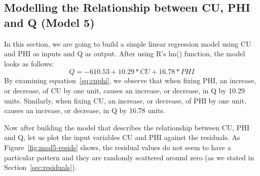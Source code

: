 \documentclass[a4paper,12pt, english]{article}
\begin{document}
\subsection{Modelling the Relationship between CU, PHI and Q (Model 5)} \label{sec:cuphimodel}
In this section, we are going to build a simple linear regression model using CU and PHI as inputs and Q as output. After using R's lm() function, the model looks as follows:\\
\begin{equation}
\label{eq:cuphi}
Q = -610.53  +     10.29*CU   +     16.78*PHI
\end{equation}       
By examining equation~\ref{eq:cuphi}, we observe that when fixing PHI, an increase, or decrease, of CU by one unit, causes an increase, or decrease, in Q by 10.29 units.
Similarly, when fixing CU, an increase, or decrease, of PHI by one unit, causes an increase, or decrease, in Q by 16.78 units.

Now after building the model that describes the relationship between CU, PHI and Q, let us plot the input variables CU and PHI against the residuals. As Figure~\ref{fig:mod5-resids} shows, the residual values do not seem to have a particular pattern and they are randomly scattered around zero (as we stated in Section~\ref{sec:residuals}).
\end{document}
